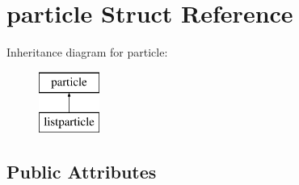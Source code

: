 \hypertarget{structparticle}{}\section{particle Struct Reference}
\label{structparticle}
Inheritance diagram for particle\+:\begin{figure}[H]
\begin{center}
\leavevmode
\includegraphics[height=2.000000cm]{structparticle}
\end{center}
\end{figure}
\subsection*{Public Attributes}
